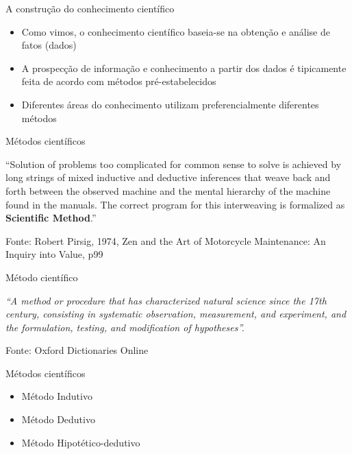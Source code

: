 \documentclass{beamer}
\begin{document}
\begin{frame}{A construção do conhecimento científico}
  \begin{itemize}
  \item Como vimos, o conhecimento científico baseia-se na obtenção e
    análise de fatos (dados)
  \item A prospecção de informação e conhecimento a partir dos dados é
    tipicamente feita de acordo com métodos pré-estabelecidos
  \item Diferentes áreas do conhecimento utilizam preferencialmente
    diferentes métodos
  \end{itemize}
\end{frame}

\begin{frame}{Métodos científicos}
  \begin{block}{}
    ``Solution of problems too complicated for common sense to solve
    is achieved by long strings of mixed \alert{inductive} and
    \alert{deductive} inferences that weave back and forth between the
    observed machine and the mental hierarchy of the machine found in
    the manuals. The correct program for this interweaving is
    formalized as {\bf Scientific Method}.''
  \end{block}

\vfill
  Fonte: Robert Pirsig, 1974, Zen and the Art of Motorcycle
  Maintenance: An Inquiry into Value, p99
\end{frame}

\begin{frame}{Método científico}
  \begin{block}{}
    {\em ``A method or procedure that has characterized natural science since the 17th century, consisting in systematic observation, measurement, and experiment, and the formulation, testing, and modification of hypotheses''.}
  \end{block}

  \vfill
  Fonte: Oxford Dictionaries Online
\end{frame}

\begin{frame}{Métodos científicos}
  \begin{itemize}
  \item Método Indutivo
  \item Método Dedutivo
  \item Método Hipotético-dedutivo
  \end{itemize}
\end{frame}
\end{document}
